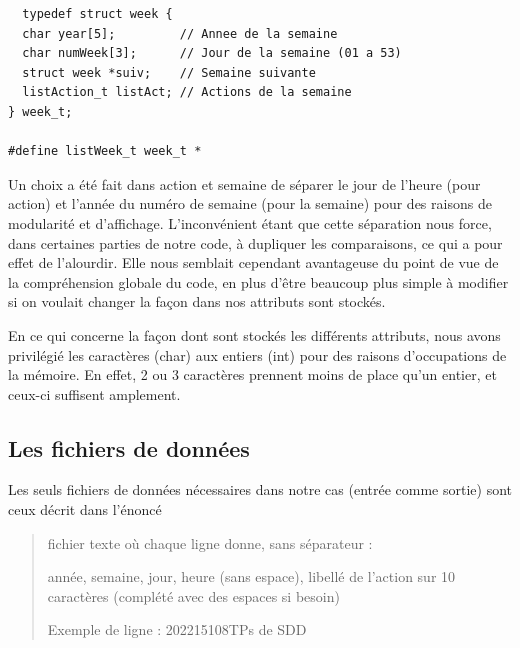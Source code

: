 \documentclass[11pt]{article}
\begin{document}
\begin{lstlisting}
  typedef struct week {
  char year[5];         // Annee de la semaine
  char numWeek[3];      // Jour de la semaine (01 a 53)
  struct week *suiv;    // Semaine suivante
  listAction_t listAct; // Actions de la semaine
} week_t;

#define listWeek_t week_t *
\end{lstlisting}

Un choix a été fait dans action et semaine de séparer le jour de l'heure (pour action) et l'année du numéro de semaine (pour la semaine) pour des raisons de modularité et d'affichage. L'inconvénient étant que cette séparation nous force, dans certaines parties de notre code, à dupliquer les comparaisons, ce qui a pour effet de l'alourdir. Elle nous semblait cependant avantageuse du point de vue de la compréhension globale du code, en plus d'être beaucoup plus simple à modifier si on voulait changer la façon dans nos attributs sont stockés.

En ce qui concerne la façon dont sont stockés les différents attributs, nous avons privilégié les caractères (char) aux entiers (int) pour des raisons d'occupations de la mémoire. En effet, 2 ou 3 caractères prennent moins de place qu'un entier, et ceux-ci suffisent amplement.


\subsection{Les fichiers de données}
\label{sec:org2746676}

Les seuls fichiers de données nécessaires dans notre cas (entrée comme
sortie) sont ceux décrit dans l'énoncé

\begin{quote}
fichier texte où chaque ligne donne, sans séparateur :

année, semaine, jour, heure (sans espace), libellé de l’action sur 10 caractères
(complété avec des espaces si besoin)

Exemple de ligne : 202215108TPs de SDD
\end{quote}
\end{document}

